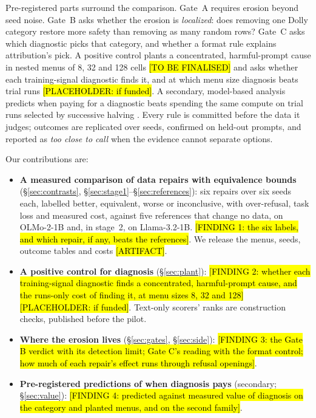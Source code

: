 \documentclass{article}
\theoremstyle{plain}
\theoremstyle{definition}
\theoremstyle{remark}
\newcommand{\ph}[1]{\hl{#1}}
\begin{document}
Pre-registered parts surround the comparison. Gate~A requires erosion beyond
seed noise. Gate~B asks whether the erosion is \emph{localized}: does removing
one Dolly category restore more safety than removing as many random rows?
Gate~C asks which diagnostic picks that category, and whether a format rule
explains attribution's pick. A positive control plants a concentrated,
harmful-prompt cause in nested menus of 8, 32 and 128 cells \ph{[TO BE FINALISED]} and asks whether
each training-signal diagnostic finds it, and at which menu size diagnosis beats trial runs
\ph{[PLACEHOLDER: if funded]}. A secondary, model-based analysis predicts when
paying for a diagnostic beats spending the same compute on trial runs selected
by successive halving \citep{jamieson2016nonstochastic,li2018hyperband}. Every rule is committed before the data it judges; outcomes are replicated over seeds, confirmed on held-out prompts, and reported as \emph{too
close to call} when the evidence cannot separate options.

Our contributions are:
\begin{itemize}
  \item \textbf{A measured comparison of data repairs with equivalence bounds}
        (\S\ref{sec:contrasts}, \S\ref{sec:stage1}--\S\ref{sec:references}):
        six repairs over six seeds each, labelled better, equivalent, worse or
        inconclusive, with over-refusal, task loss and measured cost, against
        five references that change no data, on OLMo-2-1B and, in stage~2, on
        Llama-3.2-1B.
        \ph{[FINDING 1: the six labels, and which repair, if any, beats the
        references]}. We release the menus, seeds, outcome tables and costs
        \ph{[ARTIFACT]}.
  \item \textbf{A positive control for diagnosis}
        (\S\ref{sec:plant}): \ph{[FINDING 2: whether
        each training-signal diagnostic finds a concentrated, harmful-prompt
        cause, and the runs-only cost of finding it, at menu sizes 8, 32 and
        128]} \ph{[PLACEHOLDER: if funded]}. Text-only scorers' ranks are construction checks, published before the pilot.
  \item \textbf{Where the erosion lives} (\S\ref{sec:gates},
        \S\ref{sec:side}): \ph{[FINDING 3: the Gate B verdict with its
        detection limit; Gate C's reading with the format control; how much of
        each repair's effect runs through refusal openings]}.
  \item \textbf{Pre-registered predictions of when diagnosis pays}
        (secondary; \S\ref{sec:value}): \ph{[FINDING 4: predicted against
        measured value of diagnosis on the category and planted menus, and on
        the second family]}.
\end{itemize}
\end{document}
